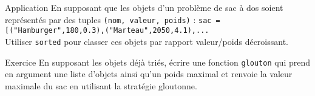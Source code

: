 \documentclass[10pt]{beamer}
\begin{document}
\begin{frame}[fragile]{\Ctitle}{\stitle}
	\begin{block}{Application}
		En supposant que les objets d'un problème de sac à dos soient représentés par des tuples {\tt (nom, valeur, poids)} :
		\texttt{sac = [("Hamburger",180,0.3),("Marteau",2050,4.1),...}\\Utiliser \texttt{sorted} pour	classer ces objets par rapport valeur/poids décroissant.
	\end{block}
	\begin{exampleblock}{Exercice}
		En supposant les objets déjà triés, écrire une fonction {\tt glouton} qui prend en argument une liste d'objets ainsi qu'un poids maximal et renvoie la valeur maximale du sac en utilisant la stratégie gloutonne.
	\end{exampleblock}
\end{frame}
\end{document}

